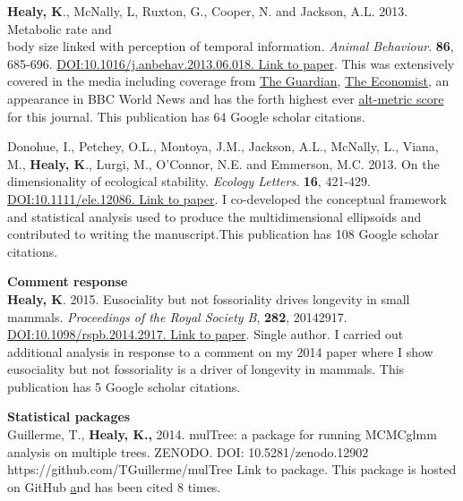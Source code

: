 \documentclass[10pt,a4paper]{article}
\begin{document}
\begin{flushleft}
\bigskip

\textbf{Healy, K}., McNally, L, Ruxton, G., Cooper, N. and Jackson, A.L. 2013. Metabolic rate and\\
body size linked with perception of temporal information.  \textit{Animal Behaviour}. \textbf{86}, 685-696. \href{http://dx.doi.org/10.1016/j.anbehav.2013.06.018}{DOI:10.1016/j.anbehav.2013.06.018. Link to paper}. This was extensively covered in the media including coverage from 
\href{https://www.theguardian.com/science/2013/sep/16/time-passes-slowly-flies-study}{The Guardian}, 
\href{http://www.economist.com/news/science-and-technology/21586532-small-creatures-fast-metabolisms-see-world-action-replay-slo-mo}{The Economist},
 an appearance in BBC World News and has the forth highest ever \href{http://www.altmetric.com/details.php?key=517059da36b98ab7d4941284da32e5f7&citation_id=1705703&embedded=true}{alt-metric score} for this journal. This publication has 64 Google scholar citations. 

\bigskip

\setlength{\parindent}{0mm}Donohue, I., Petchey, O.L., Montoya, J.M., Jackson, A.L., McNally, L., Viana, M., \textbf{Healy, K}., Lurgi, M., O’Connor, N.E. and Emmerson, M.C. 2013. On the dimensionality of ecological stability. \textit{Ecology Letters}. \textbf{16}, 421-429. \href{http://onlinelibrary.wiley.com/doi/10.1111/ele.12086/abstract} {DOI:10.1111/ele.12086. Link to paper}. I co-developed the conceptual framework and statistical analysis used to produce the multidimensional ellipsoids and contributed to writing the manuscript.This publication has 108 Google scholar citations.
\bigskip


\textbf{Comment response}\\
\setlength{\parindent}{0mm}\textbf{Healy, K}. 2015.  Eusociality but not fossoriality drives longevity in small mammals. \textit{Proceedings of the Royal Society B}, \textbf{282}, 20142917. \href{http://rspb.royalsocietypublishing.org/content/282/1806/20142917} {DOI:10.1098/rspb.2014.2917. Link to paper}.  Single author. I carried out additional analysis in response to a comment on my 2014 paper where I show eusociality but not fossoriality is a driver of longevity in mammals. This publication has 5 Google scholar citations.

\bigskip

\textbf{Statistical packages}\\
\setlength{\parindent}{0mm} Guillerme, T., \textbf{Healy, K.,} 2014. mulTree: a package for running MCMCglmm analysis on multiple trees. ZENODO. DOI: 10.5281/zenodo.12902 {https://github.com/TGuillerme/mulTree Link to package}. This package is hosted on GitHub \href{https://github.com/TGuillerme/mulTree} and has been cited 8 times.


\end{flushleft}
\end{document}
